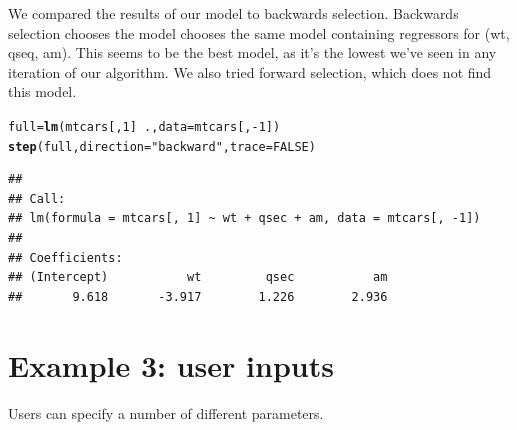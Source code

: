 \documentclass{article}\usepackage[]{graphicx}\usepackage[]{color}
\makeatletter
\newcommand{\hlnum}[1]{\textcolor[rgb]{0.686,0.059,0.569}{#1}}%
\newcommand{\hlstr}[1]{\textcolor[rgb]{0.192,0.494,0.8}{#1}}%
\newcommand{\hlopt}[1]{\textcolor[rgb]{0,0,0}{#1}}%
\newcommand{\hlstd}[1]{\textcolor[rgb]{0.345,0.345,0.345}{#1}}%
\newcommand{\hlkwb}[1]{\textcolor[rgb]{0.69,0.353,0.396}{#1}}%
\newcommand{\hlkwc}[1]{\textcolor[rgb]{0.333,0.667,0.333}{#1}}%
\newcommand{\hlkwd}[1]{\textcolor[rgb]{0.737,0.353,0.396}{\textbf{#1}}}%
\newenvironment{kframe}{%
 \def\at@end@of@kframe{}%
 \ifinner\ifhmode%
  \def\at@end@of@kframe{\end{minipage}}%
  \begin{minipage}{\columnwidth}%
 \fi\fi%
 \def\FrameCommand##1{\hskip\@totalleftmargin \hskip-\fboxsep
 \colorbox{shadecolor}{##1}\hskip-\fboxsep
     \hskip-\linewidth \hskip-\@totalleftmargin \hskip\columnwidth}%
 \MakeFramed {\advance\hsize-\width
   \@totalleftmargin\z@ \linewidth\hsize
   \@setminipage}}%
 {\par\unskip\endMakeFramed%
 \at@end@of@kframe}
\newenvironment{knitrout}{}{} %
\makeatother
\begin{document}
We compared the results of our model to backwards selection. Backwards selection chooses the model chooses the same model containing regressors for (wt, qseq, am). This seems to be the best model, as it's the lowest we've seen in any iteration of our algorithm. We also tried forward selection, which does not find this model.

\begin{knitrout}
\color{fgcolor}\begin{kframe}
\begin{alltt}
\hlstd{full}\hlkwb{=}\hlkwd{lm}\hlstd{(mtcars[,}\hlnum{1}\hlstd{]}\hlopt{~}\hlstd{.,} \hlkwc{data}\hlstd{=mtcars[,}\hlopt{-}\hlnum{1}\hlstd{])}
\hlkwd{step}\hlstd{(full,} \hlkwc{direction}\hlstd{=}\hlstr{"backward"}\hlstd{,}\hlkwc{trace}\hlstd{=}\hlnum{FALSE}\hlstd{)}
\end{alltt}
\begin{verbatim}
## 
## Call:
## lm(formula = mtcars[, 1] ~ wt + qsec + am, data = mtcars[, -1])
## 
## Coefficients:
## (Intercept)           wt         qsec           am  
##       9.618       -3.917        1.226        2.936
\end{verbatim}
\end{kframe}
\end{knitrout}

\section*{Example 3: user inputs}

Users can specify a number of different parameters.
\end{document}
